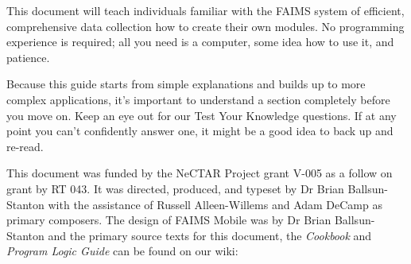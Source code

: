 \startchapter[marking={Forward}, title={Forward}]

This document will teach individuals familiar with the FAIMS system of efficient, comprehensive data collection how to create their own modules. No programming experience is required; all you need is a computer, some idea how to use it, and patience.

Because this guide starts from simple explanations and builds up to more complex applications, it's important to understand a section completely before you move on. Keep an eye out for our Test Your Knowledge questions. If at any point you can't confidently answer one, it might be a good idea to back up and re-read.

This document was funded by the NeCTAR Project grant V-005 as a follow on grant by RT 043. It was directed, produced, and typeset by Dr Brian Ballsun-Stanton with the assistance of Russell Alleen-Willems and Adam DeCamp as primary composers. The design of FAIMS Mobile was by Dr Brian Ballsun-Stanton and the primary source texts for this document, the {\em Cookbook} and {\em Program Logic Guide} can be found on our wiki: 



\stopchapter